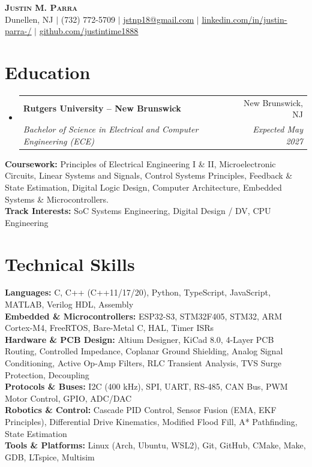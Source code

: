 \documentclass[letterpaper,10pt]{article}
\makeatletter
\newcommand{\resumeSubheading}[4]{
  \vspace{-2pt}\item
    \begin{tabular*}{0.97\textwidth}[t]{l@{\extracolsep{\fill}}r}
      \textbf{#1} & #2 \\
      \textit{\small#3} & \textit{\small #4} \\
    \end{tabular*}\vspace{-7pt}
}
\newcommand{\resumeSubHeadingListStart}{\begin{itemize}[leftmargin=0.15in, label={}]}
\newcommand{\resumeSubHeadingListEnd}{\end{itemize}}
\makeatother
\begin{document}
\begin{center}
  \textbf{\Huge \scshape Justin M. Parra} \\ \vspace{2pt}
  \small Dunellen, NJ $|$ (732) 772-5709 $|$ \href{mailto:jstnp18@gmail.com}{\underline{jstnp18@gmail.com}} $|$ \href{https://linkedin.com/in/justin-parra-/}{\underline{linkedin.com/in/justin-parra-/}} $|$ \href{https://github.com/justintime1888}{\underline{github.com/justintime1888}}
\end{center}

\section{Education}
  \resumeSubHeadingListStart
    \resumeSubheading
      {Rutgers University -- New Brunswick}{New Brunswick, NJ}
      {Bachelor of Science in Electrical and Computer Engineering (ECE)}{Expected May 2027}
  \resumeSubHeadingListEnd
  \vspace{-4pt}
  \small{\textbf{Coursework:} Principles of Electrical Engineering I \& II, Microelectronic Circuits, Linear Systems and Signals, Control Systems Principles, Feedback \& State Estimation, Digital Logic Design, Computer Architecture, Embedded Systems \& Microcontrollers.} \\ \vspace{1.5pt}
  \small{\textbf{Track Interests:} SoC Systems Engineering, Digital Design / DV, CPU Engineering}

\section{Technical Skills}
 \begin{itemize}[leftmargin=0.15in, label={}]
    \small{\item{
     \textbf{Languages:} C, C++ (C++11/17/20), Python, TypeScript, JavaScript, MATLAB, Verilog HDL, Assembly \\
     \textbf{Embedded \& Microcontrollers:} ESP32-S3, STM32F405, STM32, ARM Cortex-M4, FreeRTOS, Bare-Metal C, HAL, Timer ISRs \\
     \textbf{Hardware \& PCB Design:} Altium Designer, KiCad 8.0, 4-Layer PCB Routing, Controlled Impedance, Coplanar Ground Shielding, Analog Signal Conditioning, Active Op-Amp Filters, RLC Transient Analysis, TVS Surge Protection, Decoupling \\
     \textbf{Protocols \& Buses:} I2C (400 kHz), SPI, UART, RS-485, CAN Bus, PWM Motor Control, GPIO, ADC/DAC \\
     \textbf{Robotics \& Control:} Cascade PID Control, Sensor Fusion (EMA, EKF Principles), Differential Drive Kinematics, Modified Flood Fill, A* Pathfinding, State Estimation \\
     \textbf{Tools \& Platforms:} Linux (Arch, Ubuntu, WSL2), Git, GitHub, CMake, Make, GDB, LTspice, Multisim \\
    }}
 \end{itemize}
\end{document}

